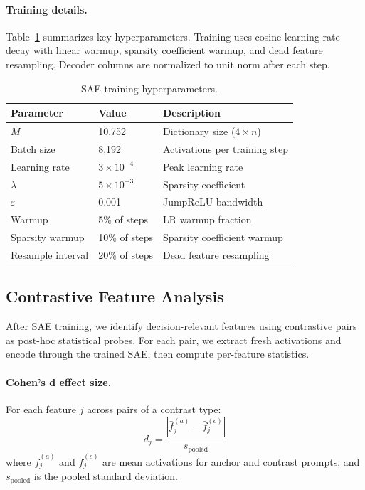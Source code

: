 \documentclass[runningheads]{llncs}
\begin{document}
\paragraph{Training details.} Table~\ref{tab:hyperparams} summarizes key hyperparameters. Training uses cosine learning rate decay with linear warmup, sparsity coefficient warmup, and dead feature resampling. Decoder columns are normalized to unit norm after each step.

\begin{table}[t]
\caption{SAE training hyperparameters.}
\label{tab:hyperparams}
\centering
\begin{tabular}{lll}
\toprule
Parameter & Value & Description \\
\midrule
$M$ & 10,752 & Dictionary size ($4\times n$) \\
Batch size & 8,192 & Activations per training step \\
Learning rate & $3 \times 10^{-4}$ & Peak learning rate \\
$\lambda$ & $5 \times 10^{-3}$ & Sparsity coefficient \\
$\varepsilon$ & 0.001 & JumpReLU bandwidth \\
Warmup & 5\% of steps & LR warmup fraction \\
Sparsity warmup & 10\% of steps & Sparsity coefficient warmup \\
Resample interval & 20\% of steps & Dead feature resampling \\
\bottomrule
\end{tabular}
\end{table}

\subsection{Contrastive Feature Analysis}

After SAE training, we identify decision-relevant features using contrastive pairs as post-hoc statistical probes. For each pair, we extract fresh activations and encode through the trained SAE, then compute per-feature statistics.

\paragraph{Cohen's d effect size.} For each feature $j$ across pairs of a contrast type:
\begin{equation}
d_j = \frac{|\bar{f}^{(a)}_j - \bar{f}^{(c)}_j|}{s_\text{pooled}}
\end{equation}
where $\bar{f}^{(a)}_j$ and $\bar{f}^{(c)}_j$ are mean activations for anchor and contrast prompts, and $s_\text{pooled}$ is the pooled standard deviation.
\end{document}
